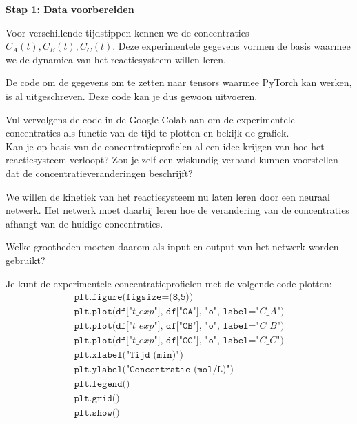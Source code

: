 \documentclass{ximera}
\begin{document}
\begin{question} \textbf{Stap 1: Data voorbereiden}

Voor verschillende tijdstippen kennen we de concentraties $C_A(t), C_B(t), C_C(t).$ Deze experimentele gegevens vormen de basis waarmee we de dynamica van het reactiesysteem willen leren.

De code om de gegevens om te zetten naar tensors waarmee PyTorch kan werken,
is al uitgeschreven. Deze code kan je dus gewoon uitvoeren.

Vul vervolgens de code in de Google Colab aan om de experimentele concentraties als functie van de tijd te plotten en bekijk de grafiek. \\
Kan je op basis van de concentratieprofielen al een idee krijgen van hoe het reactiesysteem verloopt? Zou je zelf een wiskundig verband kunnen voorstellen dat de concentratieveranderingen beschrijft?

We willen de kinetiek van het reactiesysteem nu laten leren door een neuraal netwerk. Het netwerk moet daarbij leren hoe de verandering van de concentraties afhangt van de huidige concentraties.

Welke grootheden moeten daarom als input en output van het netwerk worden gebruikt?

\begin{multipleChoice}
\end{multipleChoice}


\begin{feedback} \text{ }

Je kunt de experimentele concentratieprofielen met de volgende code plotten:
\[
\begin{array}{l}
\texttt{plt.figure(figsize=(8,5))}\\[2mm]
\texttt{plt.plot(df["$t\_exp$"], df["CA"], "o", label="$C\_A$")}\\
\texttt{plt.plot(df["$t\_exp$"], df["CB"], "o", label="$C\_B$")}\\
\texttt{plt.plot(df["$t\_exp$"], df["CC"], "o", label="$C\_C$")}\\[2mm]
\texttt{plt.xlabel("Tijd (min)")}\\
\texttt{plt.ylabel("Concentratie (mol/L)")}\\
\texttt{plt.legend()}\\
\texttt{plt.grid()}\\
\texttt{plt.show()}
\end{array}
\]


\end{feedback}
\end{question}
\end{document}
